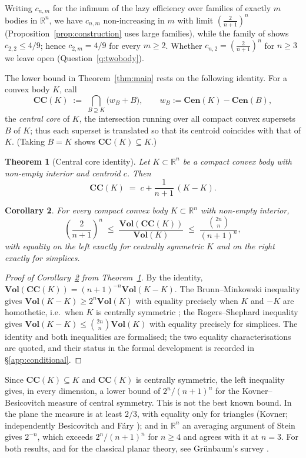 \documentclass[12pt]{article}
\newtheorem{theorem}{Theorem}
\newtheorem{corollary}[theorem]{Corollary}
\theoremstyle{definition}
\newcommand{\R}{\mathbb{R}}
\newcommand{\Vol}{\mathbf{Vol}}
\newcommand{\CC}{\mathbf{CC}}
\newcommand{\Cen}{\mathbf{Cen}}
\begin{document}
Writing $c_{n,m}$ for the infimum of the lazy efficiency over families of
exactly $m$ bodies in $\R^n$, we have $c_{n,m}$ non-increasing in $m$
with limit $\left(\tfrac{2}{n+1}\right)^n$
(Proposition~\ref{prop:construction} uses large families), while the
family of \cite{deberg} shows $c_{2,2}\le 4/9$; hence $c_{2,m} = 4/9$
for every $m\ge 2$.  Whether $c_{n,2}=\left(\tfrac{2}{n+1}\right)^n$ for
$n\ge 3$ we leave open (Question~\ref{q:twobody}).

The lower bound in Theorem~\ref{thm:main} rests on the following identity.
For a convex body $K$, call
\[
\CC(K) \;:=\; \bigcap_{B \supseteq K} \bigl(w_B + B\bigr),
\qquad w_B := \Cen(K) - \Cen(B),
\]
the {\em central core} of $K$, the intersection running over all compact
convex supersets $B$ of $K$; thus each superset is translated so that its
centroid coincides with that of $K$.  (Taking $B=K$ shows
$\CC(K)\subseteq K$.)

\begin{theorem}[Central core identity]\label{thm:core}
Let $K\subset\R^n$ be a compact convex body with non-empty interior and
centroid $c$.  Then
\[
\CC(K) \;=\; c + \frac{1}{n+1}\,(K - K).
\]
\end{theorem}

\begin{corollary}\label{cor:corevolume}
For every compact convex body $K\subset\R^n$ with non-empty interior,
\[
\left(\frac{2}{n+1}\right)^{n}
\;\le\;
\frac{\Vol(\CC(K))}{\Vol(K)}
\;\le\;
\frac{\binom{2n}{n}}{(n+1)^{n}},
\]
with equality on the left exactly for centrally symmetric $K$ and on the
right exactly for simplices.
\end{corollary}

\begin{proof}[Proof of Corollary~\ref{cor:corevolume} from
Theorem~\ref{thm:core}]
By the identity, $\Vol(\CC(K)) = (n+1)^{-n}\Vol(K-K)$.  The
Brunn--Minkowski inequality gives $\Vol(K-K)\ge 2^n\Vol(K)$ with equality
precisely when $K$ and $-K$ are homothetic, i.e.\ when $K$ is centrally
symmetric \cite{gardner,schneider}; the Rogers--Shephard inequality
\cite{rogersshephard} gives $\Vol(K-K)\le\binom{2n}{n}\Vol(K)$ with
equality precisely for simplices.  The identity and both inequalities are
formalised; the two equality characterisations are quoted, and their status
in the formal development is recorded in \S\ref{app:conditional}.
\end{proof}

Since $\CC(K)\subseteq K$ and $\CC(K)$ is centrally symmetric, the left
inequality gives, in every dimension, a lower bound of $2^n/(n+1)^n$ for the
Kovner--Besicovitch measure of central symmetry.  This is not the best known
bound.  In the plane the measure is at least $2/3$, with equality only for
triangles (Kovner; independently Besicovitch and F\'ary \cite{faryredei});
and in $\R^n$ an averaging argument of Stein gives $2^{-n}$, which exceeds
$2^n/(n+1)^n$ for $n\ge4$ and agrees with it at $n=3$.  For both results,
and for the classical planar theory, see Gr\"unbaum's survey
\cite[\S6.5]{grunbaumsurvey}.
\end{document}
